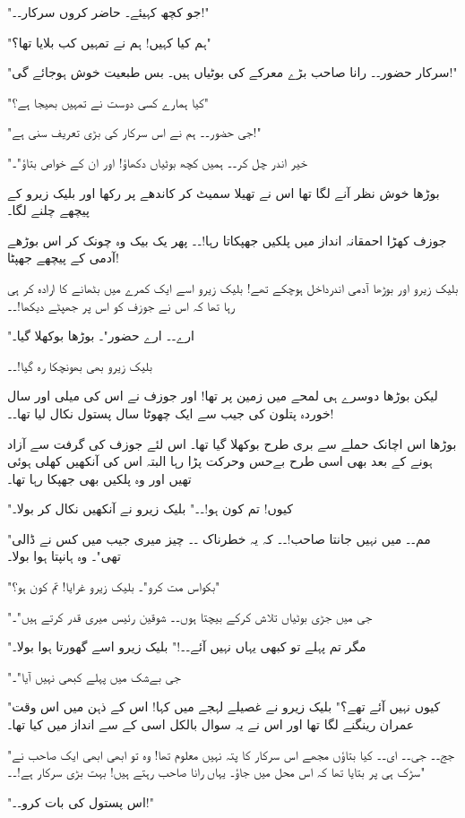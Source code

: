 "جو کچھ کہیئے۔ حاضر کروں سرکار۔۔!"

"ہم کیا کہیں! ہم نے تمہیں کب بلایا تھا؟"

"سرکار حضور۔۔ رانا صاحب بڑے معرکے کی بوٹیاں ہیں۔ بس طبعیت خوش ہوجائے گی!"

"کیا ہمارے کسی دوست نے تمہیں بھیجا ہے؟"

"جی حضور۔۔ ہم نے اس سرکار کی بڑی تعریف سنی ہے!"

"خیر اندر چل کر۔۔ ہمیں کچھ بوٹیاں دکھاؤ! اور ان کے خواص بتاؤ"۔

بوڑھا خوش نظر آنے لگا تھا اس نے تھیلا سمیٹ کر کاندھے پر رکھا اور بلیک زیرو کے پیچھے چلنے لگا۔

جوزف کھڑا احمقانہ انداز میں پلکیں جھپکاتا رہا!۔۔ پھر یک بیک وہ چونک کر اس بوڑھے آدمی کے پیچھے جھپٹا!

بلیک زیرو اور بوڑھا آدمی اندرداخل ہوچکے تھے! بلیک زیرو اسے ایک کمرے میں بٹھانے کا ارادہ کر ہی رہا تھا کہ اس نے جوزف کو اس پر جھپٹے دیکھا!۔۔

"ارے۔۔ ارے حضور"۔ بوڑھا بوکھلا گیا۔

بلیک زیرو بھی بھونچکا رہ گیا!۔۔

لیکن بوڑھا دوسرے ہی لمحے میں زمین پر تھا! اور جوزف نے اس کی میلی اور سال خوردہ پتلون کی جیب سے ایک چھوٹا سال پستول نکال لیا تھا۔۔!

بوڑھا اس اچانک حملے سے بری طرح بوکھلا گیا تھا۔ اس لئے جوزف کی گرفت سے آزاد ہونے کے بعد بھی اسی طرح بےحس وحرکت پڑا رہا البتہ اس کی آنکھیں کھلی ہوئی تھیں اور وہ پلکیں بھی جھپکا رہا تھا۔

"کیوں! تم کون ہو!۔۔" بلیک زیرو نے آنکھیں نکال کر بولا۔

"مم۔۔ میں نہیں جانتا صاحب!۔۔ کہ یہ خطرناک ۔۔ چیز میری جیب میں کس نے ڈالی تھی"۔ وہ ہانپتا ہوا بولا۔

"بکواس مت کرو"۔ بلیک زیرو غرایا! تم کون ہو؟"

"جی میں جڑی بوٹیاں تلاش کرکے بیچتا ہوں۔۔ شوقین رئیس میری قدر کرتے ہیں"۔

"مگر تم پہلے تو کبھی یہاں نہیں آئے۔۔!" بلیک زیرو اسے گھورتا ہوا بولا۔

"جی بےشک میں پہلے کبھی نہیں آیا"۔

"کیوں نہیں آئے تھے؟" بلیک زیرو نے غصیلے لہجے میں کہا! اس کے ذہن میں اس وقت عمران رینگنے لگا تھا اور اس نے یہ سوال بالکل اسی کے سے انداز میں کیا تھا۔

"جج۔۔ جی۔۔ ای۔۔ کیا بتاؤں مجھے اس سرکار کا پتہ نہیں معلوم تھا! وہ تو ابھی ابھی ایک صاحب نے سڑک ہی پر بتایا تھا کہ اس محل میں جاؤ۔ یہاں رانا صاحب رہتے ہیں! بہت بڑی سرکار ہے!۔۔"

"اس پستول کی بات کرو۔۔!"

